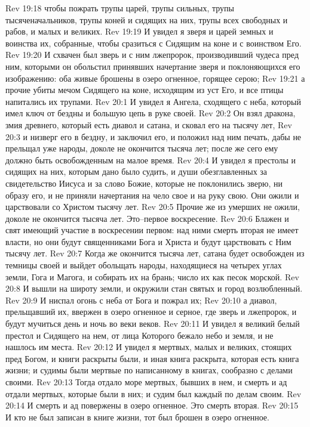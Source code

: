 Rev 19:18  чтобы пожрать трупы царей, трупы сильных, трупы тысяченачальников, трупы коней и сидящих на них, трупы всех свободных и рабов, и малых и великих.
Rev 19:19  И увидел я зверя и царей земных и воинства их, собранные, чтобы сразиться с Сидящим на коне и с воинством Его.
Rev 19:20  И схвачен был зверь и с ним лжепророк, производивший чудеса пред ним, которыми он обольстил принявших начертание зверя и поклоняющихся его изображению: оба живые брошены в озеро огненное, горящее серою;
Rev 19:21  а прочие убиты мечом Сидящего на коне, исходящим из уст Его, и все птицы напитались их трупами.
Rev 20:1  И увидел я Ангела, сходящего с неба, который имел ключ от бездны и большую цепь в руке своей.
Rev 20:2  Он взял дракона, змия древнего, который есть диавол и сатана, и сковал его на тысячу лет,
Rev 20:3  и низверг его в бездну, и заключил его, и положил над ним печать, дабы не прельщал уже народы, доколе не окончится тысяча лет; после же сего ему должно быть освобожденным на малое время.
Rev 20:4  И увидел я престолы и сидящих на них, которым дано было судить, и души обезглавленных за свидетельство Иисуса и за слово Божие, которые не поклонились зверю, ни образу его, и не приняли начертания на чело свое и на руку свою. Они ожили и царствовали со Христом тысячу лет.
Rev 20:5  Прочие же из умерших не ожили, доколе не окончится тысяча лет. Это--первое воскресение.
Rev 20:6  Блажен и свят имеющий участие в воскресении первом: над ними смерть вторая не имеет власти, но они будут священниками Бога и Христа и будут царствовать с Ним тысячу лет.
Rev 20:7  Когда же окончится тысяча лет, сатана будет освобожден из темницы своей и выйдет обольщать народы, находящиеся на четырех углах земли, Гога и Магога, и собирать их на брань; число их как песок морской.
Rev 20:8  И вышли на широту земли, и окружили стан святых и город возлюбленный.
Rev 20:9  И ниспал огонь с неба от Бога и пожрал их;
Rev 20:10  а диавол, прельщавший их, ввержен в озеро огненное и серное, где зверь и лжепророк, и будут мучиться день и ночь во веки веков.
Rev 20:11  И увидел я великий белый престол и Сидящего на нем, от лица Которого бежало небо и земля, и не нашлось им места.
Rev 20:12  И увидел я мертвых, малых и великих, стоящих пред Богом, и книги раскрыты были, и иная книга раскрыта, которая есть книга жизни; и судимы были мертвые по написанному в книгах, сообразно с делами своими.
Rev 20:13  Тогда отдало море мертвых, бывших в нем, и смерть и ад отдали мертвых, которые были в них; и судим был каждый по делам своим.
Rev 20:14  И смерть и ад повержены в озеро огненное. Это смерть вторая.
Rev 20:15  И кто не был записан в книге жизни, тот был брошен в озеро огненное.
